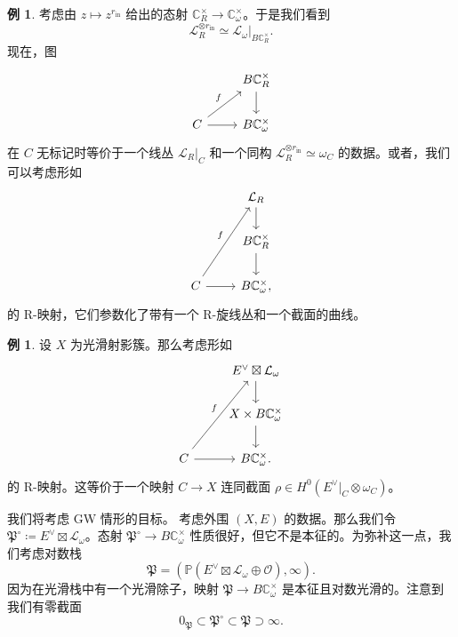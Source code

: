 \documentclass{amsart}
\theoremstyle{definition}
\newtheorem{exm}[thm]{例}
\theoremstyle{remark}
\theoremstyle{plain}
\theoremstyle{definition}
\theoremstyle{remark}
\newcommand{\C}{\mathbb{C}}
\renewcommand{\P}{\mathbb{P}}
\newcommand{\mc}[1]{\mathcal{#1}}
\newcommand{\mf}[1]{\mathfrak{#1}}
\newcommand{\mr}[1]{\mathrm{#1}}
\newcommand{\1}{\mathbf{1}}
\newcommand{\2}{\mathbf{2}}
\newcommand{\3}{\mathbf{3}}
\begin{document}
\begin{exm}
    考虑由 \(z \mapsto z^{r_{\mr{in}}}\) 给出的态射 \(\C^{\times}_R \to \C^{\times}_{\omega}\)。于是我们看到
    \[ \mc{L}_R^{\otimes r_{\mr{in}}} \simeq \mc{L}_{\omega} |_{B \C_R^{\times}}. \]
    现在，图
    \begin{equation*}
    \begin{tikzcd}
        & B \C_R^{\times} \ar{d} \\
        C \ar{ur}{f} \ar{r} & B \C_{\omega}^{\times}
    \end{tikzcd}
    \end{equation*}
    在 \(C\) 无标记时等价于一个线丛 \(\mc{L}_R|_C\) 和一个同构 \(\mc{L}_R^{\otimes r_{\mr{in}}} \simeq \omega_C\) 的数据。或者，我们可以考虑形如
    \begin{equation*}
    \begin{tikzcd}
        & \mc{L}_R \ar{d} \\
        & B \C_R^{\times} \ar{d} \\
        C \ar{uur}{f} \ar{r} & B \C_{\omega}^{\times},
    \end{tikzcd}
    \end{equation*}
    的 R-映射，它们参数化了带有一个 R-旋线丛和一个截面的曲线。
\end{exm}

\begin{exm}
    设 \(X\) 为光滑射影簇。那么考虑形如
    \begin{equation*}
    \begin{tikzcd}
        & E^{\vee} \boxtimes \mc{L}_{\omega} \ar{d} \\
        & X \times B \C_{\omega}^{\times} \ar{d} \\
        C \ar{uur}{f} \ar{r} & B \C_{\omega}^{\times}.
    \end{tikzcd}
    \end{equation*}
    的 R-映射。这等价于一个映射 \(C \to X\) 连同截面 \(\rho \in H^0(E^{\vee}|_C \otimes \omega_C)\)。
\end{exm}

我们将考虑 GW 情形的目标。
考虑外围 \((X, E)\) 的数据。那么我们令 \(\mf{P}^{\circ} \coloneqq E^{\vee} \boxtimes \mc{L}_{\omega}\)。态射 \(\mf{P}^{\circ} \to B \C_{\omega}^{\times}\) 性质很好，但它不是本征的。为弥补这一点，我们考虑对数栈
\[ \mf{P} = ( \P(E^{\vee} \boxtimes \mc{L}_{\omega} \oplus \mc{O}) , \infty). \]
因为在光滑栈中有一个光滑除子，映射 \(\mf{P} \to B \C_{\omega}^{\times}\) 是本征且对数光滑的。注意到我们有零截面
\[ 0_{\mf{P}} \subset \mf{P}^{\circ} \subset \mf{P} \supset \infty. \]
\end{document}
